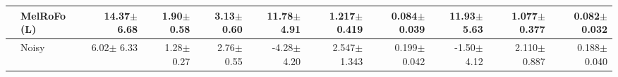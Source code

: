 \begin{table}[ht]
{\begin{tabular}{llrrrrrrrrr}
     &   MelRoFo (L) & \textbf{14.37{\scriptsize $\pm$ 6.68}} & 1.90{\scriptsize $\pm$ 0.58} & \textbf{3.13{\scriptsize $\pm$ 0.60}} & \textbf{11.78{\scriptsize $\pm$ 4.91}} & \textbf{1.217{\scriptsize $\pm$ 0.419}} & \textbf{0.084{\scriptsize $\pm$ 0.039}} & \textbf{11.93{\scriptsize $\pm$ 5.63}} & \textbf{1.077{\scriptsize $\pm$ 0.377}} & \textbf{0.082{\scriptsize $\pm$ 0.032}} \\[2pt]
    \midrule
     &   Noisy & 6.02{\scriptsize $\pm$ 6.33} & 1.28{\scriptsize $\pm$ 0.27} & 2.76{\scriptsize $\pm$ 0.55} & -4.28{\scriptsize $\pm$ 4.20} & 2.547{\scriptsize $\pm$ 1.343} & 0.199{\scriptsize $\pm$ 0.042} & -1.50{\scriptsize $\pm$ 4.12} & 2.110{\scriptsize $\pm$ 0.887} & 0.188{\scriptsize $\pm$ 0.040} \\
    \bottomrule
  \end{tabular}
  }%
\end{table}
